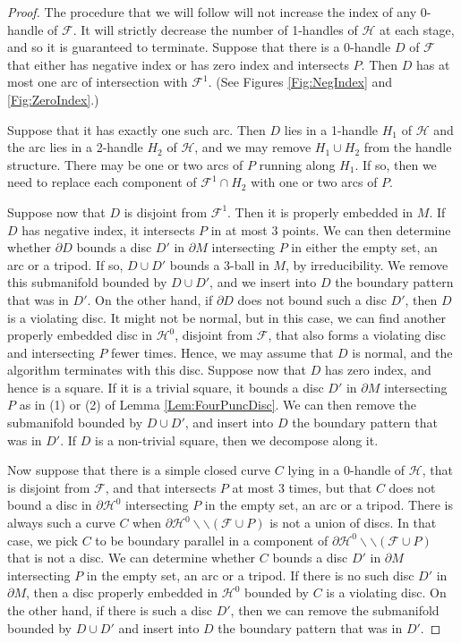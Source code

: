 \documentclass[oneside]{amsart}
\numberwithin{equation}{section}
\theoremstyle{plain}
\theoremstyle{definition}
\newcommand{\cut}{\backslash\backslash}
\newcommand{\calH}{\mathcal{H}}
\newcommand{\calF}{\mathcal{F}}
\begin{document}
\begin{proof}
The procedure that we will follow will not increase the index of any 0-handle of $\mathcal{F}$. It will strictly decrease the number of 1-handles of $\mathcal{H}$ at each stage, and so it is guaranteed to terminate. Suppose that there is a 0-handle $D$ of $\mathcal{F}$ that either has negative index or has zero index and intersects $P$. Then $D$ has at most one arc of intersection with $\mathcal{F}^1$. (See Figures \ref{Fig:NegIndex} and \ref{Fig:ZeroIndex}.)

Suppose that it has exactly one such arc. Then $D$ lies in a 1-handle $H_1$ of $\mathcal{H}$ and the arc lies in a 2-handle $H_2$ of $\mathcal{H}$, and we may remove $H_1 \cup H_2$ from the handle structure. There may be one or two arcs of $P$ running along $H_1$. If so, then we need to replace each component of $\mathcal{F}^1 \cap H_2$ with one or two arcs of $P$.

Suppose now that $D$ is disjoint from $\mathcal{F}^1$. Then it is properly embedded in $M$. If $D$ has negative index, it intersects $P$ in at most $3$ points. We can then determine whether $\partial D$ bounds a disc $D'$ in $\partial M$ intersecting $P$ in either the empty set, an arc or a tripod. If so, $D \cup D'$ bounds a 3-ball in $M$, by irreducibility. We remove this submanifold bounded by $D \cup D'$, and we insert into $D$ the boundary pattern that was in $D'$. On the other hand, if $\partial D$ does not bound such a disc $D'$, then $D$ is a violating disc. It might not be normal, but in this case, we can find another properly embedded disc in $\calH^0$, disjoint from $\calF$, that also forms a violating disc and intersecting $P$ fewer times. Hence, we may assume that $D$ is normal, and the algorithm terminates with this disc. Suppose now that
$D$ has zero index, and hence is a square. If it is a trivial square, it bounds a disc $D'$ in $\partial M$ intersecting $P$ as in (1) or (2) of Lemma \ref{Lem:FourPuncDisc}. We can then remove the submanifold bounded by $D \cup D'$, and insert into $D$ the boundary pattern that was in $D'$. If $D$ is a non-trivial square, then we decompose along it.

Now suppose that there is a simple closed curve $C$ lying in a 0-handle of $\calH$, that is disjoint from $\calF$, and that intersects $P$
at most 3 times, but that $C$ does not bound a disc in $\partial \calH^0$ intersecting $P$ in the empty set, an arc or a tripod. There is
always such a curve $C$ when $\partial \calH^0 \cut (\calF \cup P)$ is not a union of discs. In that case, we pick $C$ to be boundary parallel
in a component of $\partial \calH^0 \cut (\calF \cup P)$ that is not a disc. We can determine
whether $C$ bounds a disc $D'$ in $\partial M$ intersecting $P$ in the empty set, an arc or a tripod. If there is no such disc $D'$ in $\partial M$,
then a disc properly embedded in $\calH^0$ bounded by $C$ is a violating disc. On the other hand, if there is such a disc $D'$,
then we can remove the submanifold bounded by $D \cup D'$ and insert into $D$ the boundary pattern that was in $D'$. 


\end{proof}
\end{document}

